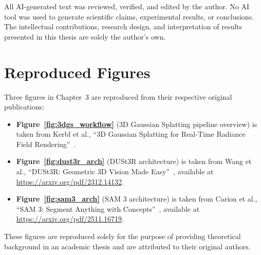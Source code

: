 All AI-generated text was reviewed, verified, and edited by the author. No AI tool was used to generate scientific claims, experimental results, or conclusions. The intellectual contributions, research design, and interpretation of results presented in this thesis are solely the author's own.

\section{Reproduced Figures}

Three figures in Chapter~3 are reproduced from their respective original publications:

\begin{itemize}
    \item \textbf{Figure~\ref{fig:3dgs_workflow}} (3D Gaussian Splatting pipeline overview) is taken from Kerbl et al., ``3D Gaussian Splatting for Real-Time Radiance Field Rendering''~\cite{kerbl20233dgs}.
    \item \textbf{Figure~\ref{fig:dust3r_arch}} (DUSt3R architecture) is taken from Wang et al., ``DUSt3R: Geometric 3D Vision Made Easy''~\cite{dust3r}, available at \url{https://arxiv.org/pdf/2312.14132}.
    \item \textbf{Figure~\ref{fig:sam3_arch}} (SAM 3 architecture) is taken from Carion et al., ``SAM 3: Segment Anything with Concepts''~\cite{sam3}, available at \url{https://arxiv.org/pdf/2511.16719}.
\end{itemize}

These figures are reproduced solely for the purpose of providing theoretical background in an academic thesis and are attributed to their original authors.
